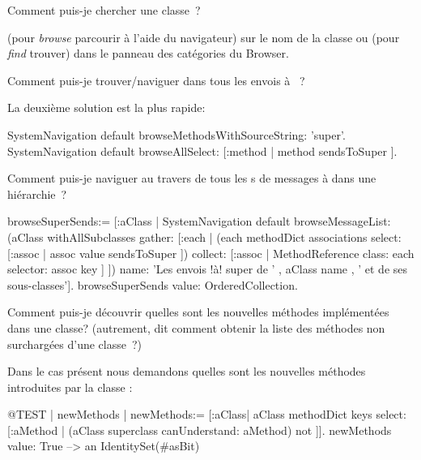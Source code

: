 \documentclass[a4paper,10pt,twoside]{book}
\begin{document}
\begin{faq}
Comment puis-je chercher une classe~?
\end{faq}
\answer
 (pour \emph{browse} \cad parcourir à l'aide du navigateur)
sur le nom de la classe ou  (pour \emph{find} \cad trouver)
dans le panneau des catégories du Browser. %

\begin{faq}
Comment puis-je trouver/naviguer dans tous les envois à \super~?
\end{faq}
\answer
La deuxième solution est la plus rapide:
\begin{code}{}
SystemNavigation default browseMethodsWithSourceString: 'super'.
SystemNavigation default browseAllSelect: [:method | method sendsToSuper ].
\end{code}

\begin{faq}
Comment puis-je naviguer au travers de tous les 
s de messages à \super dans une hiérarchie~?
\end{faq}
\answer
\begin{code}{}
browseSuperSends:= [:aClass | SystemNavigation default
	browseMessageList: (aClass withAllSubclasses gather: [:each |
		(each methodDict associations
			select: [:assoc | assoc value sendsToSuper ])
				collect: [:assoc | MethodReference class: each selector: assoc key ] ])
	name: 'Les envois !à! super de ' , aClass name , ' et de ses sous-classes'].
browseSuperSends value: OrderedCollection.
\end{code}

\begin{faq}
Comment puis-je découvrir quelles sont les nouvelles méthodes implémentées dans une classe? (autrement, dit comment obtenir la liste des méthodes non surchargées d'une classe~?) 
\end{faq}
\answer
Dans le cas présent nous demandons quelles sont les nouvelles méthodes introduites par la classe :
\begin{code}{@TEST | newMethods |}
newMethods:= [:aClass| aClass methodDict keys select:
	[:aMethod | (aClass superclass canUnderstand: aMethod) not ]].
newMethods value: True --> an IdentitySet(#asBit)
\end{code}
\end{document}
